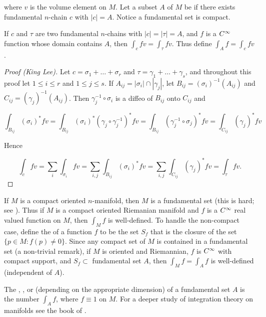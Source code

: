 \documentclass[../main]{subfiles}
\begin{document}
where $v$ is the volume element on $M$. Let a subset $A$ of $M$ be  if there exists fundamental $n$-chain $c$ with $|c|=A$. Notice a fundamental set is compact. 



\begin{proposition} \label{prop:ch7.6.1}
If $c$ and $\tau$ are two fundamental $n$-chains with $|c| = |\tau| = A$, and $f$ is a $C^\infty$ function whose domain contains $A$, then $\int_c f v = \int_\tau f v$. Thus define $\int_A f = \int_c f v$.
\end{proposition}

\begin{proof}[Proof (King Lee)]
Let $c = \sigma_1 + \ldots + \sigma_r$ and $\tau = \gamma_1 + \ldots + \gamma_s$, and throughout this proof let $1 \le i \le r$ and $1 \le j \le s$. If $A_{ij} = |\sigma_i| \cap |\gamma_j|$, let $B_{ij} = (\sigma_i)^{-1}(A_{ij})$ and $C_{ij} = (\gamma_j)^{-1}(A_{ij})$. Then $\gamma_j^{-1} \circ \sigma_i$ is a diffeo of $B_{ij}$ onto $C_{ij}$ and

\[
\int_{B_{ij}} (\sigma_i)^\ast f v = \int_{B_{ij}} (\sigma_i)^\ast (\gamma_j \circ \gamma_j^{-1})^\ast f v = \int_{B_{ij}} (\gamma_j^{-1} \circ \sigma_j)^\ast f v = \int_{C_{ij}} (\gamma_j)^\ast f v
\]

Hence

\[
\int_c f v = \sum_i \int_{\sigma_i} fv = \sum_{i, j} \int_{B_{ij}} (\sigma_i)^\ast fv = \sum_{i, j} \int_{C_{ij}} (\gamma_j)^\ast fv = \int_\tau f v.
\]
\end{proof}



If $M$ is a compact oriented $n$-manifold, then $M$ is a fundamental set (this is hard; see \cite{cairns1961a}). Thus if $M$ is a compact oriented Riemanian manifold and $f$ is a $C^\infty$ real valued function on $M$, then $\int_{M} f$ is well-defined. To handle the non-compact case, define the  of a function $f$ to be the set $S_{f}$ that is the closure of the set $\{p \in M : f(p) \ne 0\}$. Since any compact set of $M$ is contained in a fundamental set (a non-trivial remark), if $M$ is oriented and Riemannian, $f$ is $C^\infty$ with compact support, and $S_{f} \subset$ fundamental set $A$, then $\int_{M} f=\int_{A} f$ is well-defined (independent of $A$).

The , , or  (depending on the appropriate dimension) of a fundamental set $A$ is the number $\int_A f$, where $f \equiv 1$ on $M$. For a deeper study of integration theory on manifolds see the book of \cite{whitney2016geometric}. 
\end{document}
